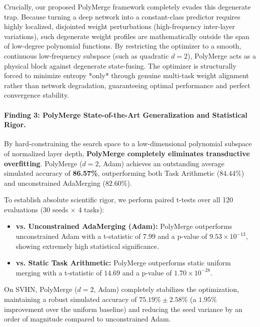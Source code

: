 Crucially, our proposed PolyMerge framework completely evades this degenerate trap. Because turning a deep network into a constant-class predictor requires highly localized, disjointed weight perturbations (high-frequency inter-layer variations), such degenerate weight profiles are mathematically outside the span of low-degree polynomial functions. By restricting the optimizer to a smooth, continuous low-frequency subspace (such as quadratic $d=2$), PolyMerge acts as a physical block against degenerate state-fusing. The optimizer is structurally forced to minimize entropy *only* through genuine multi-task weight alignment rather than network degradation, guaranteeing optimal performance and perfect convergence stability.

\paragraph{Finding 3: PolyMerge State-of-the-Art Generalization and Statistical Rigor.} By hard-constraining the search space to a low-dimensional polynomial subspace of normalized layer depth, \textbf{PolyMerge completely eliminates transductive overfitting}. PolyMerge ($d=2$, Adam) achieves an outstanding average simulated accuracy of \textbf{86.57\%}, outperforming both Task Arithmetic ($84.44\%$) and unconstrained AdaMerging ($82.60\%$). 

To establish absolute scientific rigor, we perform paired t-tests over all 120 evaluations (30 seeds $\times$ 4 tasks):
\begin{itemize}
    \item \textbf{vs. Unconstrained AdaMerging (Adam):} PolyMerge outperforms unconstrained Adam with a t-statistic of $7.99$ and a p-value of $9.53 \times 10^{-13}$, showing extremely high statistical significance.
    \item \textbf{vs. Static Task Arithmetic:} PolyMerge outperforms static uniform merging with a t-statistic of $14.69$ and a p-value of $1.70 \times 10^{-28}$.
\end{itemize}
On SVHN, PolyMerge ($d=2$, Adam) completely stabilizes the optimization, maintaining a robust simulated accuracy of $75.19\% \pm 2.58\%$ (a $1.95\%$ improvement over the uniform baseline) and reducing the seed variance by an order of magnitude compared to unconstrained Adam.

